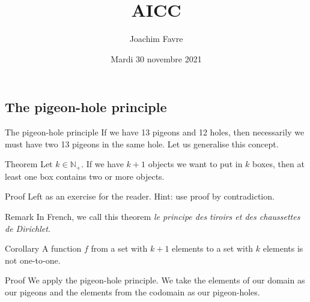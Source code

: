 \documentclass[a4paper]{article}
\title{AICC}
\author{Joachim Favre}
\date{Mardi 30 novembre 2021}
\begin{document}
\maketitle


\subsection{The pigeon-hole principle}
\begin{parag}{The pigeon-hole principle}
    If we have 13 pigeons and 12 holes, then necessarily we must have two 13 pigeons in the same hole. Let us generalise this concept.
\end{parag}

\begin{parag}{Theorem}
    Let $k \in \mathbb{N}_+$. If we have $k+1$ objects we want to put in $k$ boxes, then at least one box contains two or more objects.

    \begin{subparag}{Proof}
        Left as an exercise for the reader. Hint: use proof by contradiction.
    \end{subparag}

    \begin{subparag}{Remark}
        In French, we call this theorem \textit{le principe des tiroirs et des chaussettes de Dirichlet}.
    \end{subparag}
    
\end{parag}

\begin{parag}{Corollary}
    A function $f$ from a set with $k+1$ elements to a set with $k$ elements is not one-to-one.
    
    \begin{subparag}{Proof}
        We apply the pigeon-hole principle. We take the elements of our domain as our pigeons and the elements from the codomain as our pigeon-holes. 
    \end{subparag}
    
\end{parag}
\end{document}
